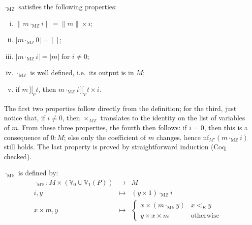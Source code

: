 \documentclass[numreferences]{kluwer}
\newcommand{\intII}{\,]\![}
\newcommand{\intrel}{\mathbin{\intII_{\rho}}}
\newcommand{\Z}{{\mathbb Z}}
\newcommand{\V}{{\mathbb V}}
\newcommand{\nf}{\ensuremath{\mathrm{nf}}}
\newcommand{\multMZ}{\ensuremath{\cdot_{\mathrm M\Z}}}
\newcommand{\multMV}{\ensuremath{\cdot_{\mathrm M\V}}}
\begin{document}
\begin{article}
\begin{proposition}\label{multMZ}
{\multMZ} satisfies the following properties:
\begin{enumerate}[(i)]
\item $\|m\multMZ i\|=\|m\|\times i$;
\item $|m\multMZ 0|=[]$;
\item $|m\multMZ i|=|m|$ for $i\neq 0$;
\item {\multMZ} is well defined, i.e.\ its output is in $M$;
\item if $m\intrel t$, then $m\multMZ i\intrel t\times i$.
\end{enumerate}
\end{proposition}
\begin{pf}
The first two properties follow directly from the definition; for the third,
just notice that, if $i\neq 0$, then $\times_{M \Z}$ translates to the
identity on the list of variables of $m$.
From these three properties, the fourth then follows: if $i=0$, then this
is a consequence of $0:M$; else only the coefficient of $m$ changes, hence
$\nf_{M'}(m\multMZ i)$ still holds.
The last property is proved by straightforward induction (Coq checked).
\end{pf}

\begin{definition}\label{defn:multMV} {\multMV} is defined by:
\begin{eqnarray*}
\multMV : M \times (\V_0\cup\V_1(P)) & \to & M \\
 i, y & \mapsto & (y\times 1)\multMZ i \\
 x\times m, y & \mapsto & 
\left\{\begin{array}{ll}x\times(m\multMV y) & x<_E y \\
 y\times x\times m & \mbox{otherwise}\end{array}\right.
\end{eqnarray*}
\end{definition}


\end{article}
\end{document}
